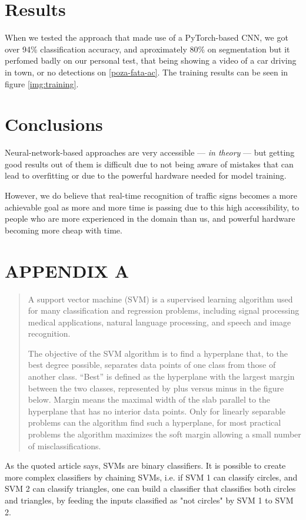 \documentclass[conference]{IEEEtran}
\begin{document}
\section{Results}

When we tested the approach that made use of a PyTorch-based CNN, we got over 94\% classification accuracy, and aproximately 80\%
on segmentation but it perfomed badly on our personal test, that being showing a video of
a car driving in town, or no detections on \ref{poza-fata-ac}. The training results can be seen in figure \ref{img:training}.

\section{Conclusions}

Neural-network-based approaches are very accessible --- \emph{in theory} --- but getting good
results out of them is difficult due to not being aware of mistakes that can lead to overfitting
or due to the powerful hardware needed for model training.

However, we do believe that real-time recognition of traffic signs becomes a more achievable goal
as more and more time is passing due to this high accessibility, to people who are more experienced
in the domain than us, and powerful hardware becoming more cheap with time.

\section*{APPENDIX A}\label{appendixa}
\blockcquote[Support Vector Machine (SVM) Explained - MATLAB \& Simulink]{matlabsvm}{
A support vector machine (SVM) is a supervised learning algorithm used for many classification and regression problems, including signal processing  medical applications, natural language processing, and speech and image recognition.

The objective of the SVM algorithm is to find a hyperplane that, to the best degree possible, separates data points of one class from those of another class. “Best” is defined as the hyperplane with the largest margin between the two classes, represented by plus versus minus in the figure below. Margin means the maximal width of the slab parallel to the hyperplane that has no interior data points. Only for linearly separable problems can the algorithm find such a hyperplane, for most practical problems the algorithm maximizes the soft margin allowing a small number of misclassifications.
}

As the quoted article says, SVMs are binary classifiers. It is possible to create more complex
classifiers by chaining SVMs, i.e. if SVM 1 can classify circles, and SVM 2 can classify triangles,
one can build a classifier that classifies both circles and triangles, by feeding the inputs classified
as "not circles" by SVM 1 to SVM 2.


\end{document}
